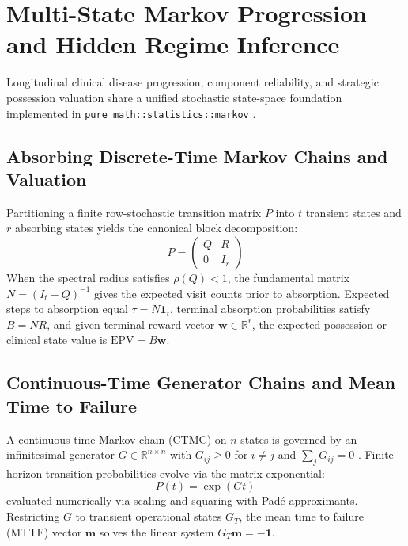 \documentclass{article}
\begin{document}
\section{Multi-State Markov Progression and Hidden Regime Inference}
Longitudinal clinical disease progression, component reliability, and strategic possession valuation share a unified stochastic state-space foundation implemented in \texttt{pure\_math::statistics::markov} \cite{norris1997markov}.

\subsection{Absorbing Discrete-Time Markov Chains and Valuation}
Partitioning a finite row-stochastic transition matrix $P$ into $t$ transient states and $r$ absorbing states yields the canonical block decomposition:
\begin{equation}
P = \begin{pmatrix} Q & R \\ 0 & I_r \end{pmatrix}
\end{equation}
When the spectral radius satisfies $\rho(Q) < 1$, the fundamental matrix $N = (I_t - Q)^{-1}$ gives the expected visit counts prior to absorption. Expected steps to absorption equal $\tau = N \mathbf{1}_t$, terminal absorption probabilities satisfy $B = N R$, and given terminal reward vector $\mathbf{w} \in \mathbb{R}^r$, the expected possession or clinical state value is $\mathrm{EPV} = B \mathbf{w}$.

\subsection{Continuous-Time Generator Chains and Mean Time to Failure}
A continuous-time Markov chain (CTMC) on $n$ states is governed by an infinitesimal generator $G \in \mathbb{R}^{n \times n}$ with $G_{ij} \ge 0$ for $i \neq j$ and $\sum_j G_{ij} = 0$ \cite{norris1997markov}. Finite-horizon transition probabilities evolve via the matrix exponential:
\begin{equation}
P(t) = \exp(G t)
\end{equation}
evaluated numerically via scaling and squaring with Pad\'{e} approximants. Restricting $G$ to transient operational states $G_T$, the mean time to failure (MTTF) vector $\mathbf{m}$ solves the linear system $G_T \mathbf{m} = -\mathbf{1}$.
\end{document}
